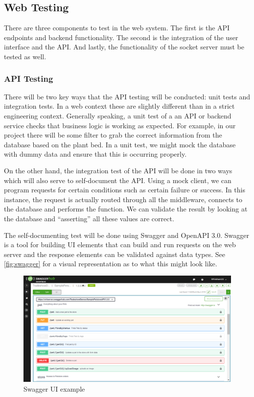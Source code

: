 \subsection{Web Testing}
There are three components to test in the web system. The first is the API endpoints and backend functionality. The second is the integration of the user interface and the API. And lastly, the functionality of the socket server must be tested as well.
\subsubsection{API Testing} \label{sec:api-test}
There will be two key ways that the API testing will be conducted: unit tests and integration tests. In a web context these are slightly different than in a strict engineering context. Generally speaking, a unit test of a an API or backend service checks that business logic is working as expected. For example, in our project there will be some filter to grab the correct information from the database based on the plant bed. In a unit test, we might mock the database with dummy data and ensure that this is occurring properly.

On the other hand, the integration test of the API will be done in two ways which will also serve to self-document the API. Using a mock client, we can program requests for certain conditions such as certain failure or success. In this instance, the request is actually routed through all the middleware, connects to the database and performs the function. We can validate the result by looking at the database and ``asserting'' all these values are correct.

The self-documenting test will be done using Swagger and OpenAPI 3.0. Swagger is a tool for building UI elements that can build and run requests on the web server and the response elements can be validated against data types. See \autoref{fig:swagger} for a visual representation as to what this might look like.

\begin{figure}[H]
    \caption{Swagger UI example}
    \label{fig:swagger}
    \centering
    \includegraphics[width=\textwidth]{images/Swagger.png}
\end{figure}

